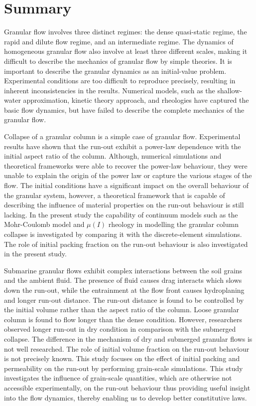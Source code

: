 \section{Summary}
Granular flow involves three distinct regimes: the dense quasi-static regime, 
the rapid and dilute flow regime, and an intermediate regime. The dynamics of 
homogeneous granular flow also involve at least three different scales, making 
it difficult to describe the mechanics of granular flow by simple theories. It 
is important to describe the granular dynamics as an initial-value problem. 
Experimental conditions are too difficult to reproduce precisely, 
resulting in inherent inconsistencies in the results. Numerical models, such as 
the shallow-water approximation, kinetic theory approach, and rheologies have 
captured the basic flow dynamics, but have failed to describe 
the complete mechanics of the granular flow.

Collapse of a granular column is a simple case of granular flow. Experimental 
results have shown that the run-out exhibit a power-law dependence with the 
initial aspect ratio of the column. Although, numerical simulations and 
theoretical frameworks were able to recover the power-law behaviour, they were 
unable to explain the origin of the power law or capture the various stages of 
the flow. The initial conditions have a significant impact on the overall 
behaviour of the granular system, however, a theoretical framework that is 
capable of describing the influence of material properties on the run-out 
behaviour is still lacking. In the present study the capability of continuum 
models such as the Mohr-Coulomb model and $\mu(I)$ rheology in modelling the 
granular column collapse is investigated by comparing it with the 
discrete-element simulations. The role of initial packing fraction on the 
run-out behaviour is also investigated in the present study.

Submarine granular flows exhibit complex interactions between the soil grains 
and the ambient fluid. The presence of fluid causes drag interacts which slows 
down the run-out, while the entrainment at the flow front causes hydroplaning 
and longer run-out distance. The run-out distance is found to be controlled by 
the initial volume rather than the aspect ratio of the column. Loose granular 
column is found to flow longer than the dense condition. However, researchers 
observed longer run-out in dry condition in comparison with the submerged 
collapse. The difference in the mechanism of dry and submerged granular flows 
is not well researched. The role of initial volume fraction on the run-out 
behaviour is not precisely known. This study focuses on the effect of initial 
packing and permeability on the run-out by performing grain-scale simulations. 
This study investigates the influence of grain-scale quantities, which are 
otherwise not accessible experimentally, on the run-out behaviour thus 
providing useful insight into the flow dynamics, thereby enabling us to develop 
better constitutive laws. 